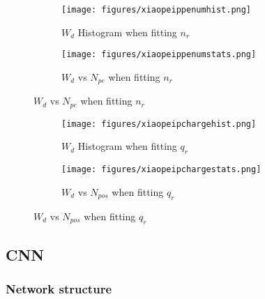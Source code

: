 \begin{figure}[H]
\begin{minipage}{.5\textwidth}
\begin{figure}[H]
    \centering
        \texttt{[image: figures/xiaopeippenumhist.png]}
    \caption{$W_{d}$ Histogram when fitting $n_{r}$}
\end{figure}
\end{minipage}
\begin{minipage}{.5\textwidth}
\begin{figure}[H]
    \centering
        \texttt{[image: figures/xiaopeippenumstats.png]}
    \caption{$W_{d}$ vs $N_{pe}$ when fitting $n_{r}$}
\end{figure}
\end{minipage}
\end{figure}
\begin{figure}[H]
\begin{minipage}{.5\textwidth}
\begin{figure}[H]
    \centering
        \texttt{[image: figures/xiaopeipchargehist.png]}
    \caption{$W_{d}$ Histogram when fitting $q_{r}$}
\end{figure}
\end{minipage}
\begin{minipage}{.5\textwidth}
\begin{figure}[H]
    \centering
        \texttt{[image: figures/xiaopeipchargestats.png]}
    \caption{$W_{d}$ vs $N_{pos}$ when fitting $q_{r}$}
\end{figure}
\end{minipage}
\end{figure}

\subsection{CNN}

\subsubsection{Network structure}

